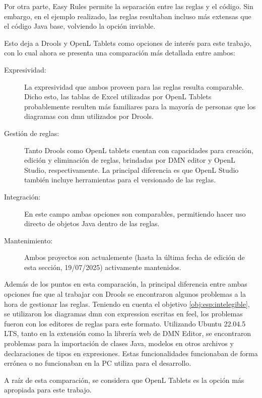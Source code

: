 Por otra parte, Easy Rules permite la separación entre las reglas y el código. Sin embargo, en el ejemplo realizado, las reglas resultaban incluso más extensas que el código Java base, volviendo la opción inviable.

Esto deja a Drools y OpenL Tablets como opciones de interés para este trabajo, con lo cual ahora se presenta una comparación más detallada entre ambos:

\begin{description}
    \item[Expresividad:] La expresividad que ambos proveen para las reglas resulta comparable. Dicho esto, las tablas de Excel utilizadas por OpenL Tablets probablemente resulten más familiares para la mayoría de personas que los diagramas con \acrfull{dmn} utilizados por Drools.
    \item[Gestión de reglas:] Tanto Drools como OpenL tablets cuentan con capacidades para creación, edición y eliminación de reglas, brindadas por DMN editor y OpenL Studio, respectivamente. La principal diferencia es que OpenL Studio también incluye herramientas para el versionado de las reglas.
    \item[Integración:] En este campo ambas opciones son comparables, permitiendo hacer uso directo de objetos Java dentro de las reglas.
    \item[Mantenimiento:] Ambos proyectos son actualemente (hasta la última fecha de edición de esta sección, 19/07/2025) activamente mantenidos.
\end{description}

Además de los puntos en esta comparación, la principal diferencia entre ambas opciones fue que al trabajar con Drools se encontraron algunos problemas a la hora de gestionar las reglas. Teniendo en cuenta el objetivo \ref{obj:esp:intelegible}, se utilizaron los diagramas \acrshort{dmn} con expression escritas en \acrfull{feel}, los problemas fueron con los editores de reglas para este formato.
Utilizando Ubuntu 22.04.5 LTS, tanto en la extensión como la librería web de DMN Editor, se encontraron problemas para la importación de clases Java, modelos en otros archivos y declaraciones de tipos en expresiones. Estas funcionalidades funcionaban de forma errónea o no funcionaban en la PC utiliza para el desarrollo.

A raíz de esta comparación, se considera que OpenL Tablets es la opción más apropiada para este trabajo.
